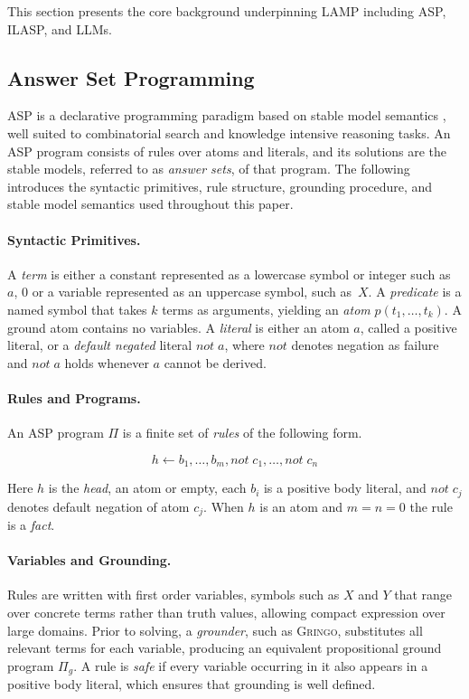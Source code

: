 \documentclass[11pt,a4paper]{article}
\begin{document}
This section presents the core background underpinning LAMP including ASP, ILASP, and LLMs.

\subsection{Answer Set Programming}

ASP is a declarative programming paradigm based on stable model semantics \cite{DBLP:series/synthesis/2012Gebser}, well suited to combinatorial search and knowledge intensive reasoning tasks. An ASP program consists of rules over atoms and literals, and its solutions are the stable models, referred to as \textit{answer sets}, of that program. The following introduces the syntactic primitives, rule structure, grounding procedure, and stable model semantics used throughout this paper.

\paragraph{Syntactic Primitives.}
A \textit{term} is either a constant represented as a lowercase symbol or integer such as\ $a$, $0$ or a variable represented as an uppercase symbol, such as\ $X$. A \textit{predicate} is a named symbol that takes $k$ terms as arguments, yielding an \textit{atom} $p(t_1,\ldots,t_k)$. A ground atom contains no variables. A \textit{literal} is either an atom $a$, called a positive literal, or a \textit{default negated} literal $\mathit{not}\; a$, where $\mathit{not}$ denotes negation as failure and $\mathit{not}\; a$ holds whenever $a$ cannot be derived.

\paragraph{Rules and Programs.}
An ASP program $\Pi$ is a finite set of \textit{rules} of the following form.

\[
    h \leftarrow b_1, \ldots, b_m, \mathit{not}\; c_1, \ldots, \mathit{not}\; c_n
\]

Here $h$ is the \textit{head}, an atom or empty, each $b_i$ is a positive body literal, and $\mathit{not}\; c_j$ denotes default negation of atom $c_j$. When $h$ is an atom and $m = n = 0$ the rule is a \textit{fact}.

\paragraph{Variables and Grounding.}
Rules are written with first order variables, symbols such as $X$ and $Y$ that range over concrete terms rather than truth values, allowing compact expression over large domains. Prior to solving, a \textit{grounder}, such as \textsc{Gringo}, substitutes all relevant terms for each variable, producing an equivalent propositional ground program $\Pi_g$. A rule is \textit{safe} if every variable occurring in it also appears in a positive body literal, which ensures that grounding is well defined.
\end{document}
